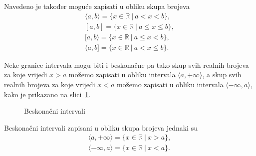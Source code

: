 Navedeno je također moguće zapisati u obliku skupa brojeva
\begin{gather*}
    \langle a,b \rangle = \{ x \in \mathbb{R} \ | \ a < x < b \},\\
    [ a,b ] = \{ x \in \mathbb{R} \ | \ a \leq x \leq b \},\\
    [ a,b \rangle = \{ x \in \mathbb{R} \ | \ a \leq x < b \},\\
    \langle a,b ] = \{ x \in \mathbb{R} \ | \ a < x \leq b \}.
\end{gather*}

Neke granice intervala mogu biti i beskonačne pa tako skup svih realnih brojeva za koje vrijedi $x>a$ možemo zapisati u obliku intervala $\langle a,+\infty \rangle$, a skup svih realnih brojeva za koje vrijedi $x<a$ možemo zapisati u obliku intervala $\langle -\infty , a \rangle$, kako je prikazano na slici~\ref{fig:beskonačni-intervali}.

\begin{figure}[ht]
\begin{center}\vspace{0.5cm}

\vspace{0.5cm}
\end{center}
\caption{Beskonačni intervali}\label{fig:beskonačni-intervali}
\end{figure}

Beskonačni intervali zapisani u obliku skupa brojeva jednaki su
\begin{gather*}
    \langle a, +\infty \rangle = \{ x \in \mathbb{R} \ | \ x > a \},\\
    \langle -\infty , a \rangle = \{ x \in \mathbb{R} \ | \ x < a \}.
\end{gather*}


